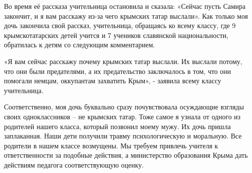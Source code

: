 Во время её рассказа учительница остановила и сказала: «Сейчас пусть Самира
закончит, и я вам расскажу из-за чего крымских татар выслали». Как только моя
дочь закончила свой рассказ, учительница, обращаясь ко всему классу, где 9
крымскотатарских детей учится и 7 учеников славянской национальности,
обратилась к детям со следующим комментарием.

«Я вам сейчас расскажу почему крымских татар выслали. Их выслали потому, что
они были предателями, а их предательство заключалось в том, что они помогали
немцам, оккупантам захватить Крым», - заявила всему классу учительница.

Соответственно, моя дочь буквально сразу почувствовала осуждающие взгляды своих
одноклассников – не крымских татар. Тоже самое я узнала от одного из родителей
нашего класса, который позвонил моему мужу. Их дочь пришла заплаканная. Наши
дети получили травму психологическую и моральную. Все родители в нашем классе
возмущены. Мы требуем привлечь учителя к ответственности за подобные действия,
а министерство образования Крыма дать действиям педагога соответствующую
оценку.

